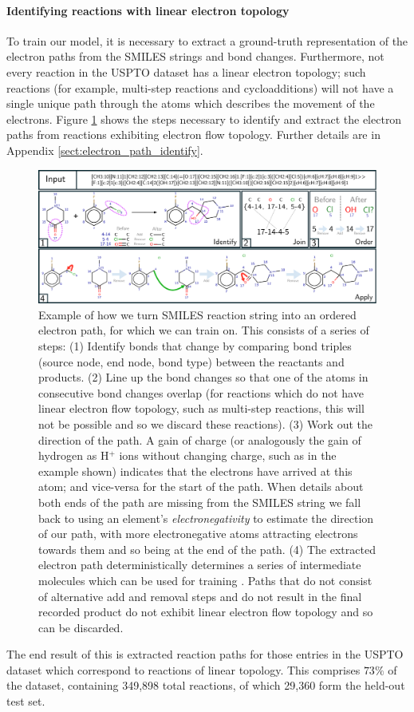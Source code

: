 \paragraph{Identifying reactions with linear electron topology}

To train our model, it is necessary to extract a ground-truth representation of the electron paths from the SMILES strings and bond changes.
Furthermore, not every reaction in the USPTO dataset has a linear electron topology; 
such reactions (for example, multi-step reactions and cycloadditions) will not have a single unique path through the atoms 
which describes the movement of the electrons. 
Figure \ref{fig:dataset_steps} shows the steps necessary to identify and extract the electron paths from reactions exhibiting electron flow topology. Further details are in Appendix \ref{sect:electron_path_identify}.


\begin{figure}
\centering
\includegraphics[width=1.\textwidth]{imgs/dataset_steps}
\caption{
Example of how we turn SMILES reaction string into an ordered electron path, for which we can train \ourModel on. 
This consists of a series of steps: 
(1) Identify bonds that change by comparing bond triples (source node, end node, bond type) between the reactants and products. 
(2) Line up the bond changes so that one of the atoms in consecutive bond changes overlap (for reactions which do not have linear electron flow topology, such as multi-step reactions, this will not be possible and so we discard these reactions).
(3) Work out the direction of the path. A gain of charge (or analogously the gain of hydrogen as H$^+$ ions without changing charge, such as in the example shown) indicates that the electrons have arrived at this atom; and vice-versa for the start of the path.
When details about both ends of the path are missing from the SMILES string we fall back to using an element's {\em electronegativity} to estimate the direction of our path, with more electronegative atoms attracting electrons towards them and so being at the end of the path. 
(4) The extracted electron path deterministically determines a series of intermediate molecules which can be used for training \ourModel. 
Paths that do not consist of alternative add and removal steps and do not result in the final recorded product do not exhibit linear electron flow topology and so can be discarded.
}
\label{fig:dataset_steps}
\end{figure}

The end result of this is extracted reaction paths for those entries in the USPTO dataset which 
correspond to reactions of linear topology.
This comprises $73\%$ of the dataset, containing 349,898 total reactions, of which 29,360 form the held-out test set.







